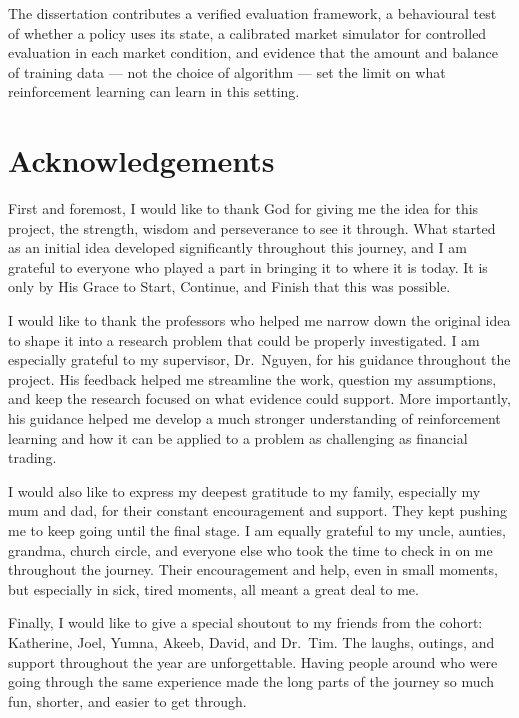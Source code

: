 \documentclass[11pt,a4paper,openany]{report}
\begin{document}
The dissertation contributes a verified evaluation framework, a
behavioural test of whether a policy uses its state, a calibrated market
simulator for controlled evaluation in each market condition, and evidence that the
amount and balance of training data --- not the choice of algorithm ---
set the limit on what reinforcement learning can learn in this setting.

\chapter*{Acknowledgements}
First and foremost, I would like to thank God for giving me the idea for
this project, the strength, wisdom and perseverance to see it through.
What started as an initial idea developed significantly throughout this
journey, and I am grateful to everyone who played a part in bringing it
to where it is today. It is only by His Grace to Start, Continue, and
Finish that this was possible.

I would like to thank the professors who helped me narrow down the
original idea to shape it into a research problem that could be properly
investigated. I am especially grateful to my supervisor, Dr.\ Nguyen, for
his guidance throughout the project. His feedback helped me streamline
the work, question my assumptions, and keep the research focused on what
evidence could support. More importantly, his guidance helped me develop
a much stronger understanding of reinforcement learning and how it can
be applied to a problem as challenging as financial trading.

I would also like to express my deepest gratitude to my family,
especially my mum and dad, for their constant encouragement and support.
They kept pushing me to keep going until the final stage. I am equally
grateful to my uncle, aunties, grandma, church circle, and everyone else
who took the time to check in on me throughout the journey. Their
encouragement and help, even in small moments, but especially in sick,
tired moments, all meant a great deal to me.

Finally, I would like to give a special shoutout to my friends from the
cohort: Katherine, Joel, Yumna, Akeeb, David, and Dr.\ Tim. The laughs,
outings, and support throughout the year are unforgettable. Having
people around who were going through the same experience made the long
parts of the journey so much fun, shorter, and easier to get through.
\end{document}
